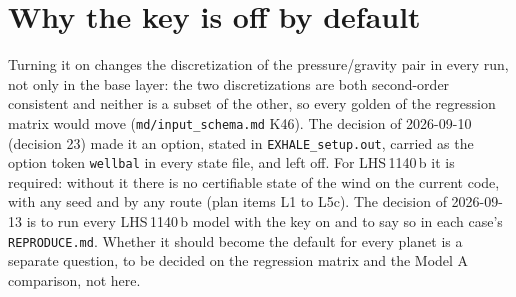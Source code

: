 \documentclass[english,a4paper]{my_memo}
\begin{document}
\section{Why the key is off by default}

Turning it on changes the discretization of the pressure/gravity pair in
every run, not only in the base layer: the two discretizations are both
second-order consistent and neither is a subset of the other, so every golden
of the regression matrix would move (\texttt{md/input\_schema.md} K46). The
decision of 2026-09-10 (decision 23) made it an option,
stated in \texttt{EXHALE\_setup.out}, carried as the option token
\texttt{wellbal} in every state file, and left off. For LHS\,1140\,b it is
required: without it there is no certifiable state of the wind on the current
code, with any seed and by any route (plan items L1 to L5c). The decision of
2026-09-13 is to run every LHS\,1140\,b model
with the key on and to say so in each case's \texttt{REPRODUCE.md}. Whether
it should become the default for every planet is a separate question, to be
decided on the regression matrix and the Model A comparison, not here.
\end{document}
